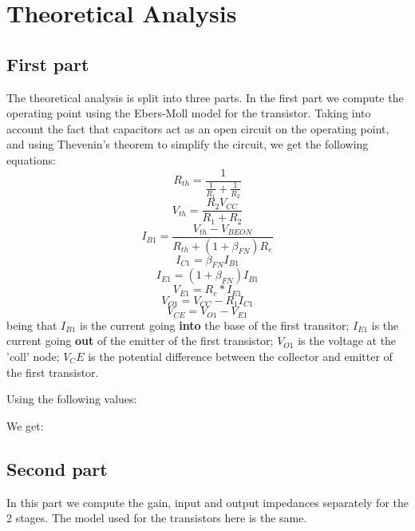\section{Theoretical Analysis}
\label{sec:analysis}

\subsection{First part}
The theoretical analysis is split into three parts. In the first part we compute the operating point using the Ebers-Moll model for the transistor. Taking into account the fact that capacitors act as an open circuit on the operating point, and using Thevenin's theorem to simplify the circuit, we get the following equations:
\begin{equation*}
    R_{th} = \frac{1}{\frac{1}{R_{1}} + \frac{1}{R_{2}}}
\end{equation*}
\begin{equation*}
    V_{th} = \frac{R_{2}V_{CC}}{R_{1}+R_{2}}
\end{equation*}
\begin{equation*}
    I_{B1} = \frac{V_{th} - V_{BEON}}{R_{th} + (1+\beta_{FN})R_{e}}
\end{equation*}
\begin{equation*}
    I_{C1} = \beta_{FN} I_{B1}
\end{equation*}
\begin{equation*}
    I_{E1} = (1+\beta_{FN})I_{B1}
\end{equation*}
\begin{equation*}
    V_{E1} = R_{e}*I_{E1}
\end{equation*}
\begin{equation*}
    V_{O1} = V_{CC}-R_{1}I_{C1}
\end{equation*}
\begin{equation*}
    V_{CE} = V_{O1}-V_{E1}
\end{equation*}
being that $I_{B1}$ is the current going \textbf{into} the base of the first transitor; $I_{E1}$ is the current going \textbf{out} of the emitter of the first transistor; $V_{O1}$ is the voltage at the 'coll' node; $V_CE$ is the potential difference between the collector and emitter of the first transistor. 

Using the following values:



We get:




\subsection{Second part}
In this part we compute the gain, input and output impedances separately for the 2 stages.
The model used for the transistors here is the same.

